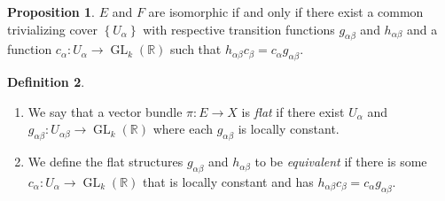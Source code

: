 \documentclass[10pt,letterpaper,cm]{nupset}
\theoremstyle{definition}
\newtheorem{definition}{Definition}[subsection]
\theoremstyle{theorem}
\newtheorem{prop}[definition]{Proposition}
\theoremstyle{remark}
\newcommand{\R}{\mathbb{R}}
\newcommand{\1}{\mathbb{1}}
\newcommand{\0}{\vec 0}
\DeclareMathOperator{\GL}{GL}
\begin{document}
\begin{prop}
$E$ and $F$ are isomorphic if and only if there exist a common trivializing cover $\left\{U_{\alpha}\right\}$ with respective transition functions $g_{\alpha{\beta}}$ and $h_{\alpha{\beta}}$ and a function $c_{\alpha} :U_{\alpha} \to \GL_k(\R)$ such that $h_{\alpha{\beta}}c_{\beta} = c_{\alpha}g_{\alpha{\beta}}$.
\end{prop}

\begin{definition} $ $
\begin{enumerate}
\item We say that a vector bundle $\pi : E \to X$ is \textit{flat} if there exist $U_{\alpha}$ and $g_{\alpha{\beta}} : U_{\alpha{\beta}} \to \GL_k(\R)$ where each $g_{\alpha{\beta}}$ is locally constant. 
\item We define the flat structures $g_{\alpha{\beta}}$ and $h_{\alpha{\beta}}$ to be \textit{equivalent} if there is some $c_{\alpha} : U_{\alpha} \to \GL_k(\R)$ that is locally constant and has $h_{\alpha{\beta}}c_{\beta} = c_{\alpha}g_{\alpha{\beta}}$.
\end{enumerate}
\end{definition}
\end{document}
